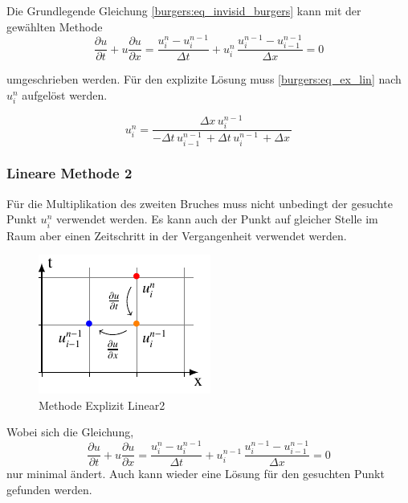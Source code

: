 	Die Grundlegende Gleichung \ref{burgers:eq_invisid_burgers} kann mit der gewählten Methode
	\begin{equation}
	  	\frac {\partial u}{\partial t}+u{\frac {\partial u}{\partial x}} = \frac{u_{i}^{n}-u_{i}^{n-1}}{\Delta t}+ u_{i}^{n}\, \frac{u_{i}^{n-1}-u_{i-1}^{n-1}}{\Delta x}=0
	  	  \label{burgers:eq_ex_lin1}
	  	\end{equation}
	  	
	  	umgeschrieben werden.
	  	Für den explizite Lösung muss \ref{burgers:eq_ex_lin} nach $ u_{i}^{n}$ aufgelöst werden.
	  	
	  	\begin{equation}
	  u_{i}^{n} = \frac{\Delta{x}\, u^{n-1}_{i}\,}{- \Delta{t}\, u^{n-1}_{i-1}\, + \Delta{t}\, u^{n-1}_{i}\, + \Delta{x}\,}
		  \label{burgers:eq_ex_sol_lin1}
	\end{equation}

	
	
\subsubsection{Lineare Methode 2}
	
	
	Für die Multiplikation des zweiten Bruches muss nicht unbedingt der gesuchte Punkt $u_{i}^{n}$ verwendet werden.
	Es kann auch der Punkt auf gleicher Stelle im Raum aber einen Zeitschritt in der Vergangenheit verwendet werden.
	
	
     \begin{figure}[!ht]
	\centering
	\includegraphics[height=.4\textwidth]{papers/burgers/BurgersEquation/tikz/Linear2/Linear2.pdf}
	\caption{Methode Explizit Linear2}
	\label{burgers:fig:Linear2}
	\end{figure}

	Wobei sich die Gleichung,
	\begin{equation}
			\frac {\partial u}{\partial t}+u{\frac {\partial u}{\partial x}} = \frac{u_{i}^{n}-u_{i}^{n-1}}{\Delta t}+ u_{i}^{n-1}\, \frac{u_{i}^{n-1}-u_{i-1}^{n-1}}{\Delta x}=0
		\label{burgers:eq_ex_lin2}
	\end{equation}
	 nur minimal ändert.
	 Auch kann wieder eine Lösung für den gesuchten Punkt gefunden werden.
	
